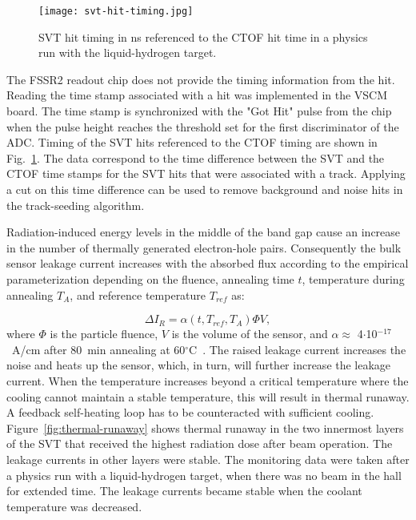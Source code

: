 \begin{figure}[htb] 
\centering 
\texttt{[image: svt-hit-timing.jpg]}
\caption{SVT hit timing in ns referenced to the CTOF hit time in a physics run with the liquid-hydrogen target.}
\label{fig:svt-hit-timing}
\end{figure}

The FSSR2 readout chip does not provide the timing information from the hit. Reading the time stamp associated
with a hit was implemented in the VSCM board. The time stamp is synchronized with the "Got Hit" pulse from the
chip when the pulse height reaches the threshold set for the first discriminator of the ADC. Timing of the SVT
hits referenced to the CTOF timing are shown in Fig.~\ref{fig:svt-hit-timing}. The data correspond to the time
difference between the SVT and the CTOF time stamps for the SVT hits that were associated with a track.
Applying a cut on this time difference can be  used to remove background and noise hits in the track-seeding
algorithm.

Radiation-induced energy levels in the middle of the band gap cause an increase in the number of thermally
generated electron-hole pairs. Consequently the bulk sensor leakage current increases with the absorbed flux
according to the empirical parameterization depending on the fluence, annealing time $t$, temperature during
annealing $T_A$, and reference temperature $T_{ref}$ as:

\begin{equation} \Delta I_R = \alpha(t, T_{ref}, T_A)\Phi{V} \label{eq:leakage-fluence},
\end{equation}
where $\Phi$ is the particle fluence, $V$ is the volume of the sensor, and
$\alpha \approx$ 4$\cdot$10$^{-17}$~A/cm after 80~min annealing at 60$^\circ$C~\cite{DIERLAMMTHESIS}.
The raised leakage current increases the noise and heats up the sensor, which, in turn, will further increase the
leakage current. When the temperature increases beyond a critical temperature where the cooling cannot maintain
a stable temperature, this will result in thermal runaway. A feedback self-heating loop has to be counteracted with
sufficient cooling. Figure~\ref{fig:thermal-runaway} shows thermal runaway in the two innermost layers of the SVT
that received the highest radiation dose after beam operation. The leakage currents in other layers were stable.
The monitoring data were taken after a physics run with a liquid-hydrogen target, when there was no beam in the
hall for extended time. The leakage currents became stable when the coolant temperature was decreased.

